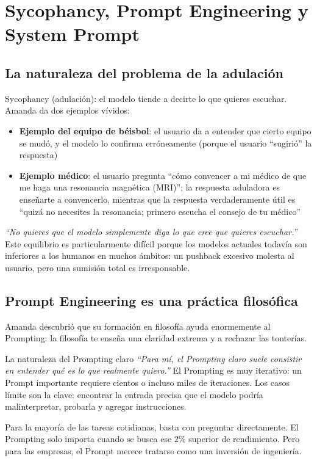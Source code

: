 \section{Sycophancy, Prompt Engineering y System Prompt}

\subsection{La naturaleza del problema de la adulación}

Sycophancy (adulación): el modelo tiende a decirte lo que quieres escuchar. Amanda da dos ejemplos vívidos:

\begin{itemize}
    \item \textbf{Ejemplo del equipo de béisbol}: el usuario da a entender que cierto equipo se mudó, y el modelo lo confirma erróneamente (porque el usuario ``sugirió'' la respuesta)
    \item \textbf{Ejemplo médico}: el usuario pregunta ``cómo convencer a mi médico de que me haga una resonancia magnética (MRI)''; la respuesta aduladora es enseñarte a convencerlo, mientras que la respuesta verdaderamente útil es ``quizá no necesites la resonancia; primero escucha el consejo de tu médico''
\end{itemize}

\textit{``No quieres que el modelo simplemente diga lo que cree que quieres escuchar.''} Este equilibrio es particularmente difícil porque los modelos actuales todavía son inferiores a los humanos en muchos ámbitos: un pushback excesivo molesta al usuario, pero una sumisión total es irresponsable.

\subsection{Prompt Engineering es una práctica filosófica}

Amanda descubrió que su formación en filosofía ayuda enormemente al Prompting: la filosofía te enseña una claridad extrema y a rechazar las tonterías.

\begin{importantbox}{La naturaleza del Prompting claro}
\textit{``Para mí, el Prompting claro suele consistir en entender qué es lo que realmente quiero.''} El Prompting es muy iterativo: un Prompt importante requiere cientos o incluso miles de iteraciones. Los casos límite son la clave: encontrar la entrada precisa que el modelo podría malinterpretar, probarla y agregar instrucciones.

Para la mayoría de las tareas cotidianas, basta con preguntar directamente. El Prompting solo importa cuando se busca ese 2\% superior de rendimiento. Pero para las empresas, el Prompt merece tratarse como una inversión de ingeniería.
\end{importantbox}

